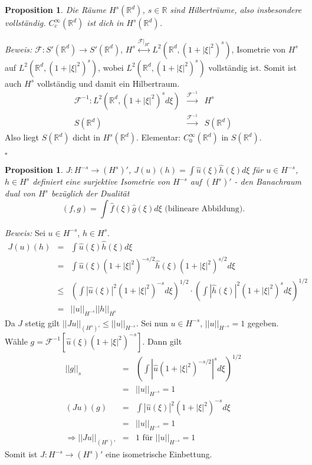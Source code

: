 \documentclass[12pt,a4paper,titlepage]{scrartcl}
\newtheorem{Prop}[Satz]{Proposition}
\numberwithin{equation}{section}
\newcommand{\R}{\mathbb{R}} %
\newcommand{\f}{\hat{f}}
\newcommand{\g}{\hat{g}}
\newcommand{\F}{\mathcal{F}}
\newcommand{\m}{\cdot}
\newcommand{\Bew}{\emph{Beweis: }}
\newcommand{\qed}{\begin{flushright}
		$\square$
	\end{flushright}}
\begin{document}
	\begin{Prop}
		Die Räume $H^s(\R^d)$, $s\in \R$ sind Hilberträume, also insbesondere vollständig. $C_c^\infty(\R^d)$ ist dich in $H^s(\R^d)$.
	\end{Prop}
	
	\Bew $\F:S'(\R^d)\rightarrow S'(\R^d)$, $H^s\overset{\F|_{H^s}}{\leftrightarrow} L^2(\R^d, (1+|\xi|^2)^s)$, Isometrie von $H^s$ auf $L^2(\R^d, (1+|\xi|^2)^s)$, wobei $L^2(\R^d, (1+|\xi|^2)^s)$ vollständig ist. Somit ist auch $H^s$ vollständig und damit ein Hilbertraum.
	\begin{eqnarray}
		\F^{-1}: L^2(\R^d,(1+|\xi|^2)^s d\xi) &\overset{\F^{-1}}{\rightarrow}& H^s\nonumber\\
		S(\R^d)&\overset{\F^{-1}}{\rightarrow}& S(\R^d)\nonumber
	\end{eqnarray}
	Also liegt $S(\R^d)$ dicht in $H^s(\R^d)$. Elementar: $C_0^\infty(\R^d)$ in $S(\R^d)$.
	\qed
	
	\begin{Prop}
		$J:H^{-s}\rightarrow (H^s)'$, $J(u)(h) = \int \hat u(\xi) \hat h(\xi)d\xi$ für $u\in H^{-s}$, $h\in H^s$ definiert eine surjektive Isometrie von $H^{-s}$ auf $(H^s)'$ - den Banachraum dual von $H^s$ bezüglich der Dualität 
		$$(f,g) = \int \f(\xi)\g(\xi)d\xi \text{ (bilineare Abbildung)}.$$
	\end{Prop}
	
	\Bew Sei $u\in H^{-s}$, $h\in H^s$. 
	\begin{eqnarray}
		J(u)(h) &=& \int\hat u(\xi)\hat h(\xi)d\xi\nonumber\\
		&=& \int\hat u(\xi) (1+|\xi|^2)^{-s/2}\hat h(\xi)(1+|\xi|^2)^{s/2}d\xi\nonumber\\
		&\leq& \left(\int |\hat u(\xi)|^2 (1+|\xi|^2)^{-s} d\xi \right)^{1/2}\m \left(\int |\hat h(\xi)|^2 (1+|\xi|^2)^{s} d\xi \right)^{1/2}\nonumber\\
		&=& ||u||_{H^{-s}} ||h||_{H^s} \nonumber
	\end{eqnarray}
	Da $J$ stetig gilt $||J u||_{(H^s)'}\leq ||u||_{H^{-s}}$. Sei nun $u\in H^{-s}$, $||u||_{H^{-s}}= 1$ gegeben. Wähle $g = \F^{-1}[\hat u(\xi)(1+|\xi|^2)^{-s}]$. Dann gilt
	\begin{eqnarray}
		||g||_s &=& \left(\int|\hat u(1+|\xi|^2)^{-s/2}|^s d\xi \right)^{1/2}\nonumber\\
		&=& ||u||_{H^{-s}} = 1\nonumber\\
		(Ju)(g) &=& \int |\hat u(\xi)|^2(1+|\xi|^2)^{-s}d\xi\nonumber\\
		&=& ||u||_{H^{-s}} = 1\nonumber\\
		\Rightarrow ||Ju||_{(H^s)'} &=& 1\text{ für } ||u||_{H^{-s}} = 1\nonumber
	\end{eqnarray}
	Somit ist $J:H^{-s}\rightarrow (H^s)'$ eine isometrische Einbettung. 
	
\end{document}
